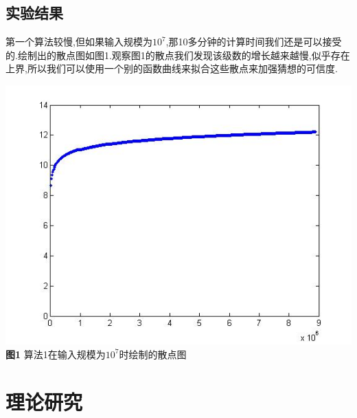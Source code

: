 \documentclass[a4paper,12pt]{article}
\begin{document}
\begin{CJK*}{UTF8}{gbsn}
\subsection{实验结果}
第一个算法较慢,但如果输入规模为$10^7$,那10多分钟的计算时间我们还是可以接受的.绘制出的散点图如图1.观察图1的散点我们发现该级数的增长越来越慢,似乎存在上界,所以我们可以使用一个别的函数曲线来拟合这些散点来加强猜想的可信度.
\begin{center}
\includegraphics[width = 13.5cm]{Report02_1.jpg}\\
\textbf{图1} 算法1在输入规模为$10^7$时绘制的散点图\\
\end{center}
\section{理论研究}

\end{CJK*}
\end{document}
